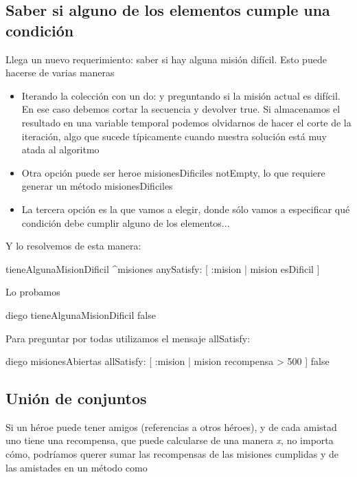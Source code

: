 \documentclass[a4paper,12pt]{book}
\begin{document}
\subsection{Saber si alguno de los elementos cumple una condición}
Llega un nuevo requerimiento: saber si hay alguna misión difícil. Esto puede hacerse de varias maneras

\begin{itemize}
 \item Iterando la colección con un do: y preguntando si la misión actual es difícil. En ese caso debemos
 cortar la secuencia y devolver true. Si almacenamos el resultado en una variable temporal podemos olvidarnos
 de hacer el corte de la iteración, algo que sucede típicamente cuando nuestra solución está muy atada al algoritmo
 \item Otra opción puede ser heroe misionesDificiles notEmpty, lo que requiere generar
 un método misionesDificiles
 \item La tercera opción es la que vamos a elegir, donde sólo vamos a especificar qué condición debe cumplir alguno
 de los elementos...
\end{itemize}

Y lo resolvemos de esta manera:

\begin{code}
tieneAlgunaMisionDificil
      ^misiones anySatisfy: [ :mision | mision esDificil ] 
\end{code}

Lo probamos

\begin{code}
diego tieneAlgunaMisionDificil
    false
\end{code}

Para preguntar por todas utilizamos el mensaje allSatisfy:

\begin{code}
diego misionesAbiertas allSatisfy: [ :mision | mision recompensa > 500 ]
    false
\end{code}

\subsection{Unión de conjuntos}

Si un héroe puede tener amigos (referencias a otros héroes), y de cada amistad uno tiene una recompensa, que 
puede calcularse de una manera \textit{x}, no importa cómo, podríamos querer sumar las recompensas de las misiones
cumplidas y de las amistades en un método como
\end{document}

